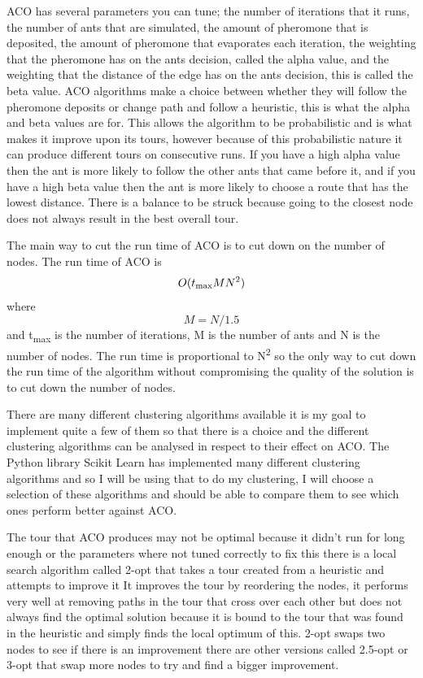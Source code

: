 ACO has several parameters you can tune; the number of iterations that it runs, the number of ants that are simulated, the amount of pheromone that is deposited, the amount of pheromone that evaporates each iteration, the weighting that the pheromone has on the ants decision, called the alpha value, and the weighting that the distance of the edge has on the ants decision, this is called the beta value. ACO algorithms make a choice between whether they will follow the pheromone deposits or change path and follow a heuristic, this is what the alpha and beta values are for. This allows the algorithm to be probabilistic and is what makes it improve upon its tours, however because of this probabilistic nature it can produce different tours on consecutive runs. If you have a high alpha value then the ant is more likely to follow the other ants that came before it, and if you have a high beta value then the ant is more likely to choose a route that has the lowest distance. There is a balance to be struck because going to the closest node does not always result in the best overall tour.

The main way to cut the run time of ACO is to cut down on the number of nodes. The run time of ACO is \[O(t\textsubscript{max}MN^2)\] where \[M=N/1.5\] and t\textsubscript{max} is the number of iterations, M is the number of ants and N is the number of nodes\cite{pang_chao-yang_ben-qiong_zhang_jie_wei_shan_zheng-chao_2014}. The run time is proportional to N\textsuperscript{2} so the only way to cut down the run time of the algorithm without compromising the quality of the solution is to cut down the number of nodes.

There are many different clustering algorithms available it is my goal to implement quite a few of them so that there is a choice and the different clustering algorithms can be analysed in respect to their effect on ACO. The Python library Scikit Learn\cite{scikit_learn_python_library} has implemented many different clustering algorithms\cite{scikit_clustering} and so I will be using that to do my clustering, I will choose a selection of these algorithms and should be able to compare them to see which ones perform better against ACO.

The tour that ACO produces may not be optimal because it didn't run for long enough or the parameters where not tuned correctly to fix this there is a local search algorithm called 2-opt that takes a tour created from a heuristic and attempts to improve it\cite{venhuis_2019} It improves the tour by reordering the nodes, it performs very well at removing paths in the tour that cross over each other but does not always find the optimal solution because it is bound to the tour that was found in the heuristic and simply finds the local optimum of this. 2-opt swaps two nodes to see if there is an improvement there are other versions called 2.5-opt or 3-opt that swap more nodes to try and find a bigger improvement. 

